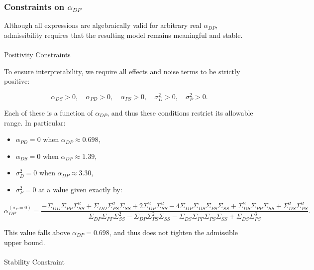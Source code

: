 \documentclass[
]{article}
\makeatletter
\let\oldparagraph\paragraph
\renewcommand{\paragraph}{
    \@ifstar
      \xxxParagraphStar
      \xxxParagraphNoStar
  }
\newcommand{\xxxParagraphStar}[1]{\oldparagraph*{#1}\mbox{}}
\newcommand{\xxxParagraphNoStar}[1]{\oldparagraph{#1}\mbox{}}
\providecommand{\tightlist}{%
  \setlength{\itemsep}{0pt}\setlength{\parskip}{0pt}}\usepackage{longtable,booktabs,array}
\makeatother
\begin{document}
\subsubsection{\texorpdfstring{Constraints on
\(\alpha_{DP}\)}{Constraints on \textbackslash alpha\_\{DP\}}}\label{constraints-on-alpha_dp}

Although all expressions are algebraically valid for arbitrary real
\(\alpha_{DP}\), admissibility requires that the resulting model remains
meaningful and stable.

\paragraph{Positivity Constraints}\label{positivity-constraints}

To ensure interpretability, we require all effects and noise terms to be
strictly positive:

\[
\alpha_{DS} > 0, \quad \alpha_{PD} > 0, \quad \alpha_{PS} > 0, \quad \sigma_D^2 > 0, \quad \sigma_P^2 > 0.
\]

Each of these is a function of \(\alpha_{DP}\), and thus these
conditions restrict its allowable range. In particular:

\begin{itemize}
\tightlist
\item
  \(\alpha_{PD} = 0\) when \(\alpha_{DP} \approx 0.698\),
\item
  \(\alpha_{DS} = 0\) when \(\alpha_{DP} \approx 1.39\),
\item
  \(\sigma_D^2 = 0\) when \(\alpha_{DP} \approx 3.30\),
\item
  \(\sigma_P^2 = 0\) at a value given exactly by:
\end{itemize}

\[
\alpha_{DP}^{(\sigma_P = 0)} =
\frac{
- \Sigma_{DD} \Sigma_{PP} \Sigma_{SS}^2 + \Sigma_{DD} \Sigma_{PS}^2 \Sigma_{SS}
+ 2 \Sigma_{DP}^2 \Sigma_{SS}^2 - 4 \Sigma_{DP} \Sigma_{DS} \Sigma_{PS} \Sigma_{SS}
+ \Sigma_{DS}^2 \Sigma_{PP} \Sigma_{SS} + \Sigma_{DS}^2 \Sigma_{PS}^2
}{
\Sigma_{DP} \Sigma_{PP} \Sigma_{SS}^2 - \Sigma_{DP} \Sigma_{PS}^2 \Sigma_{SS}
- \Sigma_{DS} \Sigma_{PP} \Sigma_{PS} \Sigma_{SS} + \Sigma_{DS} \Sigma_{PS}^3
}.
\]

This value falls above \(\alpha_{DP} = 0.698\), and thus does not
tighten the admissible upper bound.

\paragraph{Stability Constraint}\label{stability-constraint}
\end{document}
